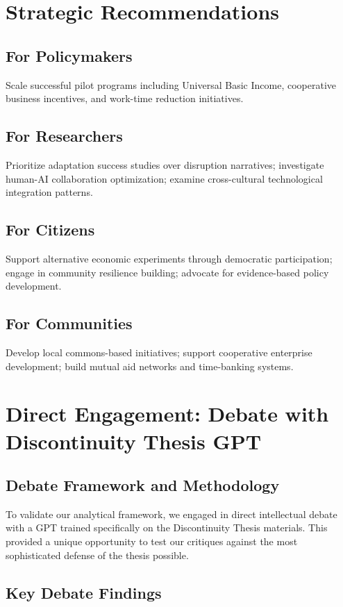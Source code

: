 \documentclass[11pt,a4paper]{article}
\begin{document}
\section{Strategic Recommendations}

\subsection{For Policymakers}
Scale successful pilot programs including Universal Basic Income, cooperative business incentives, and work-time reduction initiatives.

\subsection{For Researchers}  
Prioritize adaptation success studies over disruption narratives; investigate human-AI collaboration optimization; examine cross-cultural technological integration patterns.

\subsection{For Citizens}
Support alternative economic experiments through democratic participation; engage in community resilience building; advocate for evidence-based policy development.

\subsection{For Communities}
Develop local commons-based initiatives; support cooperative enterprise development; build mutual aid networks and time-banking systems.

\section{Direct Engagement: Debate with Discontinuity Thesis GPT}

\subsection{Debate Framework and Methodology}

To validate our analytical framework, we engaged in direct intellectual debate with a GPT trained specifically on the Discontinuity Thesis materials. This provided a unique opportunity to test our critiques against the most sophisticated defense of the thesis possible.

\subsection{Key Debate Findings}
\end{document}
